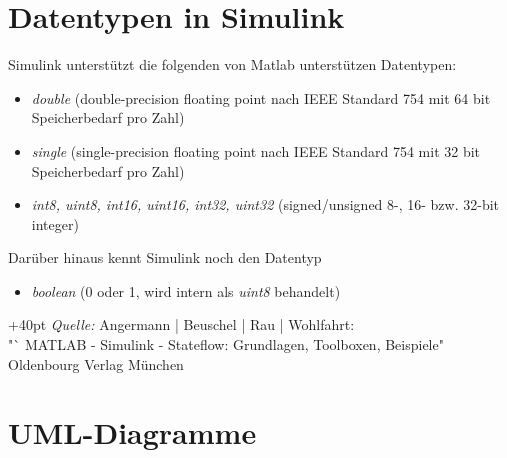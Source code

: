 \documentclass[fontsize = 12pt, paper = a4]{scrreprt}
\begin{document}
{%

\listoffigures

%


\appendix
{} 

\section{Datentypen in Simulink}

Simulink unterstützt die folgenden von Matlab unterstützen Datentypen:

\begin{itemize}

\item \textit{double} (double-precision floating point nach IEEE Standard 754 mit 64 bit Speicherbedarf pro Zahl)

\item \textit{single} (single-precision floating point nach IEEE Standard 754 mit 32 bit Speicherbedarf pro Zahl)

\item \textit{int8, uint8, int16, uint16, int32, uint32} (signed/unsigned 8-, 16- bzw. 32-bit integer)

\end{itemize}

Darüber hinaus kennt Simulink noch den Datentyp

\begin{itemize}

\item \textit{boolean} (0 oder 1, wird intern als \textit{uint8} behandelt)

\end{itemize} 
\hangindent+40pt 
\textit{Quelle:} Angermann | Beuschel | Rau | Wohlfahrt: \\         "` MATLAB - Simulink - Stateflow: Grundlagen, Toolboxen, Beispiele"\ \\
Oldenbourg Verlag München



\section{UML-Diagramme}

}
\end{document}
